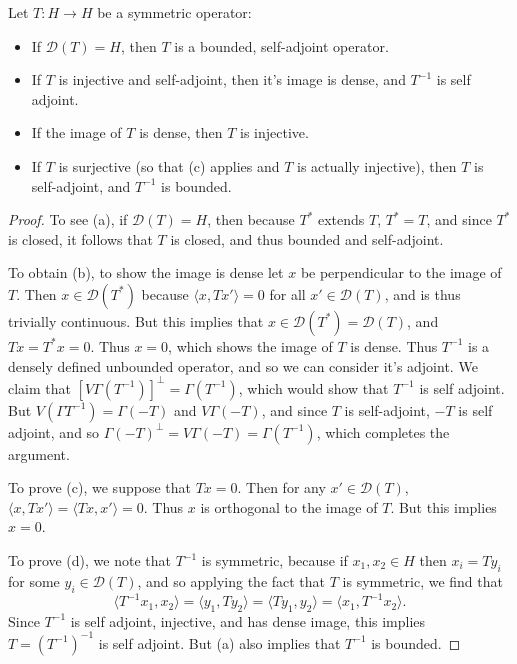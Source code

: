 \begin{theorem}
    Let $T: H \to H$ be a symmetric operator:
    \begin{itemize}
        \item If $\mathcal{D}(T) = H$, then $T$ is a bounded, self-adjoint operator.
        \item If $T$ is injective and self-adjoint, then it's image is dense, and $T^{-1}$ is self adjoint.
        \item If the image of $T$ is dense, then $T$ is injective.
        \item If $T$ is surjective (so that (c) applies and $T$ is actually injective), then $T$ is self-adjoint, and $T^{-1}$ is bounded.
    \end{itemize}
\end{theorem}
\begin{proof}
    To see (a), if $\mathcal{D}(T) = H$, then because $T^*$ extends $T$, $T^* = T$, and since $T^*$ is closed, it follows that $T$ is closed, and thus bounded and self-adjoint. 

    To obtain (b), to show the image is dense let $x$ be perpendicular to the image of $T$. Then $x \in \mathcal{D}(T^*)$ because $\langle x, Tx' \rangle = 0$ for all $x' \in \mathcal{D}(T)$, and is thus trivially continuous. But this implies that $x \in \mathcal{D}(T^*) = \mathcal{D}(T)$, and $Tx = T^*x = 0$. Thus $x = 0$, which shows the image of $T$ is dense. Thus $T^{-1}$ is a densely defined unbounded operator, and so we can consider it's adjoint. We claim that $[V\Gamma(T^{-1})]^\perp = \Gamma(T^{-1})$, which would show that $T^{-1}$ is self adjoint. But $V(\Gamma T^{-1}) = \Gamma(-T)$ and $V \Gamma(-T)$, and since $T$ is self-adjoint, $-T$ is self adjoint, and so $\Gamma(-T)^\perp = V \Gamma(-T) = \Gamma(T^{-1})$, which completes the argument.

    To prove (c), we suppose that $Tx = 0$. Then for any $x' \in \mathcal{D}(T)$, $\langle x, Tx' \rangle = \langle Tx, x' \rangle = 0$. Thus $x$ is orthogonal to the image of $T$. But this implies $x = 0$.

    To prove (d), we note that $T^{-1}$ is symmetric, because if $x_1,x_2 \in H$ then $x_i = Ty_i$ for some $y_i \in \mathcal{D}(T)$, and so applying the fact that $T$ is symmetric, we find that
    \[ \langle T^{-1} x_1, x_2 \rangle = \langle y_1, Ty_2 \rangle = \langle Ty_1, y_2 \rangle = \langle x_1, T^{-1} x_2 \rangle. \]
    Since $T^{-1}$ is self adjoint, injective, and has dense image, this implies $T = (T^{-1})^{-1}$ is self adjoint. But (a) also implies that $T^{-1}$ is bounded.
\end{proof}

